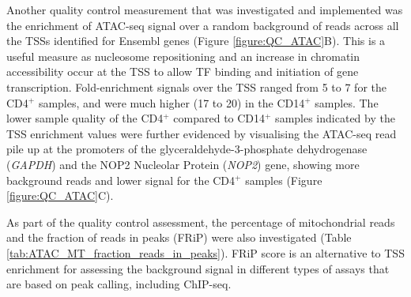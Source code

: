 Another quality control measurement that was investigated and implemented was the enrichment of ATAC-seq signal over a random background of reads across all the TSSs identified for Ensembl genes (Figure \ref{figure:QC_ATAC}B). This is a useful measure as nucleosome repositioning and an increase in chromatin accessibility occur at the TSS to allow TF binding and initiation of gene transcription. Fold-enrichment signals over the TSS ranged from 5 to 7 for the CD4$^+$ samples, and were much higher (17 to 20) in the CD14$^+$ samples. The lower sample quality of the CD4$^+$ compared to CD14$^+$ samples indicated by the TSS enrichment values were further evidenced by visualising the ATAC-seq read pile up at the promoters of the glyceraldehyde-3-phosphate dehydrogenase (\textit{GAPDH}) and the NOP2 Nucleolar Protein (\textit{NOP2}) gene, showing more background reads and lower signal for the CD4$^+$ samples (Figure \ref{figure:QC_ATAC}C).
	
As part of the quality control assessment, the percentage of mitochondrial reads and the fraction of reads in peaks (FRiP) were also investigated (Table \ref{tab:ATAC_MT_fraction_reads_in_peaks}). FRiP score is an alternative to TSS enrichment for assessing the background signal in different types of assays that are based on peak calling, including ChIP-seq.

